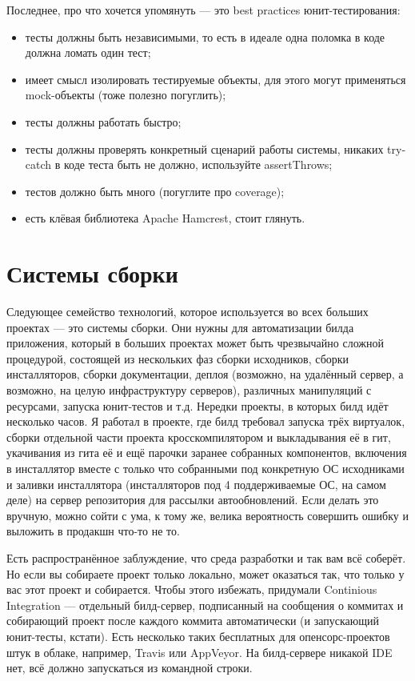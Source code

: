 \documentclass[a5paper]{article}
\begin{document}
Последнее, про что хочется упомянуть --- это best practices юнит-тестирования:
\begin{itemize}
	\item тесты должны быть независимыми, то есть в идеале одна поломка в коде должна ломать один тест;
	\item имеет смысл изолировать тестируемые объекты, для этого могут применяться mock-объекты (тоже полезно погуглить);
	\item тесты должны работать быстро;
	\item тесты должны проверять конкретный сценарий работы системы, никаких try-catch в коде теста быть не должно, используйте assertThrows;
	\item тестов должно быть много (погуглите про coverage);
	\item есть клёвая библиотека Apache Hamcrest, стоит глянуть.
\end{itemize}

\section{Системы сборки}

Следующее семейство технологий, которое используется во всех больших проектах --- это системы сборки. Они нужны для автоматизации билда приложения, который в больших проектах может быть чрезвычайно сложной процедурой, состоящей из нескольких фаз сборки исходников, сборки инсталляторов, сборки документации, деплоя (возможно, на удалённый сервер, а возможно, на целую инфраструктуру серверов), различных манипуляций с ресурсами, запуска юнит-тестов и т.д. Нередки проекты, в которых билд идёт несколько часов. Я работал в проекте, где билд требовал запуска трёх виртуалок, сборки отдельной части проекта кросскомпилятором и выкладывания её в гит, укачивания из гита её и ещё парочки заранее собранных компонентов, включения в инсталлятор вместе с только что собранными под конкретную ОС исходниками и заливки инсталлятора (инсталляторов под 4 поддерживаемые ОС, на самом деле) на сервер репозитория для рассылки автообновлений. Если делать это вручную, можно сойти с ума, к тому же, велика вероятность совершить ошибку и выложить в продакшн что-то не то.

Есть распространённое заблуждение, что среда разработки и так вам всё соберёт. Но если вы собираете проект только локально, может оказаться так, что только у вас этот проект и собирается. Чтобы этого избежать, придумали Continious Integration --- отдельный билд-сервер, подписанный на сообщения о коммитах и собирающий проект после каждого коммита автоматически (и запускающий юнит-тесты, кстати). Есть несколько таких бесплатных для опенсорс-проектов штук в облаке, например, Travis или AppVeyor. На билд-сервере никакой IDE нет, всё должно запускаться из командной строки.
\end{document}
